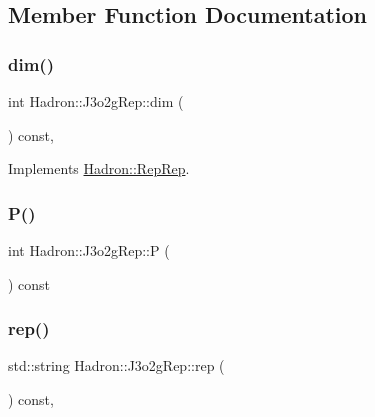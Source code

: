 \subsection{Member Function Documentation}
\mbox{\label{structHadron_1_1J3o2gRep_af7221b9d11d215d51a39f93dc0dfaf88}} 
\subsubsection{\texorpdfstring{dim()}{dim()}}
{\footnotesize\ttfamily int Hadron\+::\+J3o2g\+Rep\+::dim (\begin{DoxyParamCaption}{ }\end{DoxyParamCaption}) const\hspace{0.3cm}{\ttfamily [inline]}, {\ttfamily [virtual]}}



Implements \mbox{\hyperlink{structHadron_1_1RepRep_a92c8802e5ed7afd7da43ccfd5b7cd92b}{Hadron\+::\+Rep\+Rep}}.

\mbox{\label{structHadron_1_1J3o2gRep_a52046d4b4dfe6708dfd95c7477fa09ae}} 
\subsubsection{\texorpdfstring{P()}{P()}}
{\footnotesize\ttfamily int Hadron\+::\+J3o2g\+Rep\+::P (\begin{DoxyParamCaption}{ }\end{DoxyParamCaption}) const\hspace{0.3cm}{\ttfamily [inline]}}

\mbox{\label{structHadron_1_1J3o2gRep_a17dda74a4f77bec727e5d13b21917c8f}} 
\subsubsection{\texorpdfstring{rep()}{rep()}}
{\footnotesize\ttfamily std\+::string Hadron\+::\+J3o2g\+Rep\+::rep (\begin{DoxyParamCaption}{ }\end{DoxyParamCaption}) const\hspace{0.3cm}{\ttfamily [inline]}, {\ttfamily [virtual]}}



